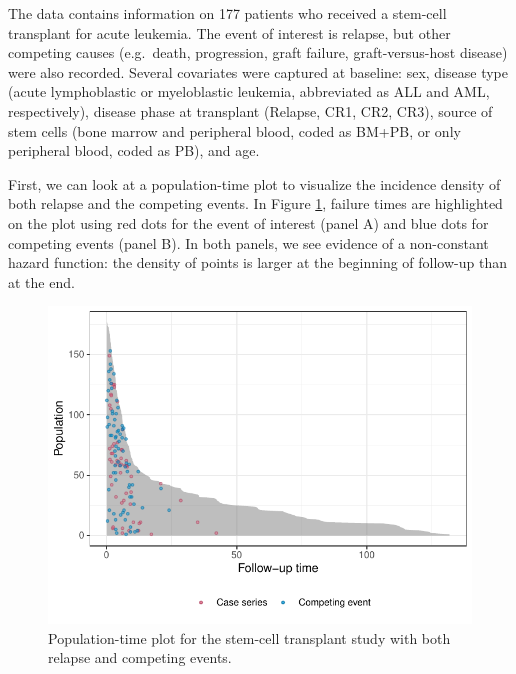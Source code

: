 \documentclass[
]{jss}
\begin{document}
The data contains information on 177 patients who received a stem-cell
transplant for acute leukemia. The event of interest is relapse, but
other competing causes (e.g.~death, progression, graft failure,
graft-versus-host disease) were also recorded. Several covariates were
captured at baseline: sex, disease type (acute lymphoblastic or
myeloblastic leukemia, abbreviated as ALL and AML, respectively),
disease phase at transplant (Relapse, CR1, CR2, CR3), source of stem
cells (bone marrow and peripheral blood, coded as BM+PB, or only
peripheral blood, coded as PB), and age.

First, we can look at a population-time plot to visualize the incidence
density of both relapse and the competing events. In Figure
\ref{fig:compPop}, failure times are highlighted on the plot using red
dots for the event of interest (panel A) and blue dots for competing
events (panel B). In both panels, we see evidence of a non-constant
hazard function: the density of points is larger at the beginning of
follow-up than at the end.

\begin{CodeChunk}
\begin{figure}

{\centering \includegraphics{../figures/compPop-1} 

}

\caption[Population-time plot for the stem-cell transplant study with both relapse and competing events]{Population-time plot for the stem-cell transplant study with both relapse and competing events.}\label{fig:compPop}
\end{figure}
\end{CodeChunk}
\end{document}
